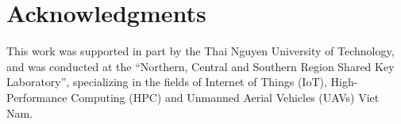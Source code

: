 \ifdefined\IJRCSsubmission\else
\section*{Acknowledgments}

This work was supported in part by the Thai Nguyen University of
Technology, and was conducted at the ``Northern, Central and Southern
Region Shared Key Laboratory'', specializing in the fields of Internet
of Things (IoT), High-Performance Computing (HPC) and Unmanned Aerial
Vehicles (UAVs) Viet Nam.
\fi
